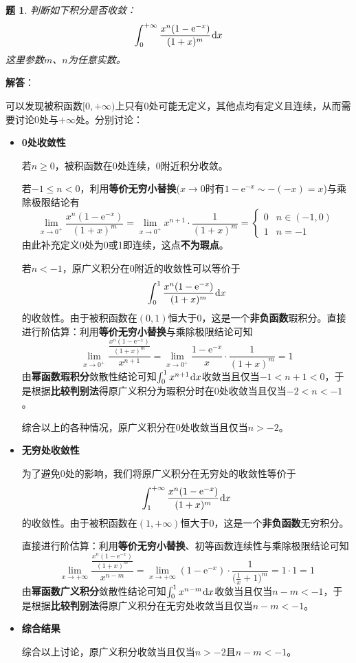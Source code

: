 \documentclass[a4paper,UTF8,fontset=windows,AutoFakeBold]{ctexart}
\newcommand*{\dr}{\hspace{0.07em}\mathrm{d}}
\newcommand*{\er}{\mathrm{e}}
\theoremstyle{ex}
\newtheorem{exercise}{题}
\newcommand{\sol}[1]{{\vspace{5pt}\kaishu\noindent\textbf{解答}：\vspace{-3pt}
\begin{compactitem}
    \item[] #1
\end{compactitem}
}}
\begin{document}
\begin{framed}
\begin{exercise}
    判断如下积分是否收敛：
    $$\int_0^{+\infty}\frac{x^n(1-\er^{-x})}{(1+x)^m}\dr x$$
    这里参数$m$、$n$为任意实数。
\end{exercise}
\sol{
    可以发现被积函数$[0,+\infty)$上只有0处可能无定义，其他点均有定义且连续，从而需要讨论0处与$+\infty$处。分别讨论：
    \begin{itemize}
        \item \textbf{0处收敛性}
        
        若$n\ge0$，被积函数在0处连续，0附近积分收敛。
        
        若$-1\le n<0$，利用\textbf{等价无穷小替换}($x\to0$时有$1-\er^{-x}\sim-(-x)=x$)与乘除极限结论有
        $$\lim_{x\to0^+}\frac{x^n(1-\er^{-x})}{(1+x)^m}=\lim_{x\to0^+}x^{n+1}\cdot\frac{1}{(1+x)^m}=\begin{cases}0&n\in(-1,0)\\1&n=-1\end{cases}$$
        由此补充定义0处为0或1即连续，这点\textbf{不为瑕点}。

        若$n<-1$，原广义积分在0附近的收敛性可以等价于
        $$\int_0^1\frac{x^n(1-\er^{-x})}{(1+x)^m}\dr x$$
        的收敛性。由于被积函数在$(0,1)$恒大于0，这是一个\textbf{非负函数}瑕积分。直接进行阶估算：利用\textbf{等价无穷小替换}与乘除极限结论可知
        $$\lim_{x\to0^+}\frac{\frac{x^n(1-\er^{-x})}{(1+x)^m}}{x^{n+1}}=\lim_{x\to0^+}\frac{1-\er^{-x}}{x}\cdot\frac{1}{(1+x)^m}=1$$
        由\textbf{幂函数瑕积分}敛散性结论可知$\int_0^1x^{n+1}\dr x$收敛当且仅当$-1<n+1<0$，于是根据\textbf{比较判别法}得原广义积分为瑕积分时在0处收敛当且仅当$-2<n<-1$。
        
        综合以上的各种情况，原广义积分在0处收敛当且仅当$n>-2$。
        
        \item \textbf{无穷处收敛性}
        
        为了避免0处的影响，我们将原广义积分在无穷处的收敛性等价于
        $$\int_1^{+\infty}\frac{x^n(1-\er^{-x})}{(1+x)^m}\dr x$$
        的收敛性。由于被积函数在$(1,+\infty)$恒大于0，这是一个\textbf{非负函数}无穷积分。
        
        直接进行阶估算：利用\textbf{等价无穷小替换}、初等函数连续性与乘除极限结论可知
        $$\lim_{x\to+\infty}\frac{\frac{x^n(1-\er^{-x})}{(1+x)^m}}{x^{n-m}}=\lim_{x\to+\infty}(1-\er^{-x})\cdot\frac{1}{\big(\frac{1}{x}+1\big)^m}=1\cdot1=1$$
        由\textbf{幂函数广义积分}敛散性结论可知$\int_0^1x^{n-m}\dr x$收敛当且仅当$n-m<-1$，于是根据\textbf{比较判别法}得原广义积分在无穷处收敛当且仅当$n-m<-1$。

        \item \textbf{综合结果}

        综合以上讨论，原广义积分收敛当且仅当$n>-2$且$n-m<-1$。
    \end{itemize}
}
\end{framed}
\end{document}
